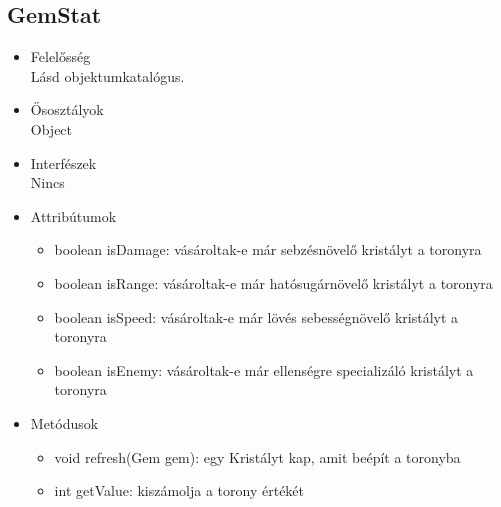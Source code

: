 \subsection{GemStat}
\begin{itemize}
\item Felelősség\\
 Lásd objektumkatalógus.
\item Ősosztályok\\
Object
\item Interfészek\\
Nincs
\item Attribútumok
	\begin{itemize}
		\item boolean isDamage: vásároltak-e már sebzésnövelő kristályt a toronyra
		\item boolean isRange: vásároltak-e már hatósugárnövelő kristályt a toronyra
		\item boolean isSpeed: vásároltak-e már lövés sebességnövelő kristályt a toronyra
		\item boolean isEnemy: vásároltak-e már ellenségre specializáló kristályt a toronyra 

		
	\end{itemize}
\item Metódusok
	\begin{itemize}
	
		\item void refresh(Gem gem): egy Kristályt kap, amit beépít a toronyba
		\item int getValue: kiszámolja a torony értékét
		
		
	\end{itemize}
\end{itemize}
